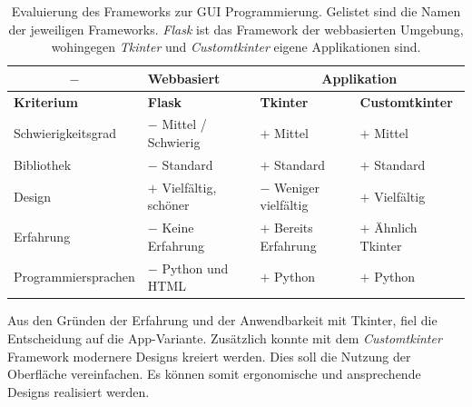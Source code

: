 \begin{table}[H]
    \centering
    \begin{tabular}{l|l|l|l}
        \multicolumn{1}{c|}{$-$}&   \textbf{Webbasiert}&        \multicolumn{2}{c}{\textbf{Applikation}}\\
        \hline
        \textbf{Kriterium}&         \textbf{Flask}&             \textbf{Tkinter}&           \textbf{Customtkinter}\\
        \hline
        Schwierigkeitsgrad&         $-$ Mittel / Schwierig&     $+$ Mittel&                 $+$ Mittel\\
        Bibliothek&                 $-$ Standard&               $+$ Standard&               $+$ Standard\\
        Design&                     $+$ Vielfältig, schöner&    $-$ Weniger vielfältig&     $+$ Vielfältig\\
        Erfahrung&                  $-$ Keine Erfahrung&        $+$ Bereits Erfahrung&      $+$ Ähnlich Tkinter\\
        Programmiersprachen&        $-$ Python und HTML&        $+$ Python&                 $+$ Python\\
    \end{tabular}
    \caption{Evaluierung des Frameworks zur GUI Programmierung. Gelistet sind die Namen der jeweiligen Frameworks. \textit{Flask} ist das Framework der webbasierten Umgebung, wohingegen \textit{Tkinter} und \textit{Customtkinter} eigene Applikationen sind.}
    \label{tab:gui_programming}
\end{table}

Aus den Gründen der Erfahrung und der Anwendbarkeit mit Tkinter, fiel die Entscheidung auf die App-Variante. Zusätzlich konnte mit dem \textit{Customtkinter} Framework modernere Designs kreiert werden. Dies soll die Nutzung der Oberfläche vereinfachen. Es können somit ergonomische und ansprechende Designs realisiert werden.

